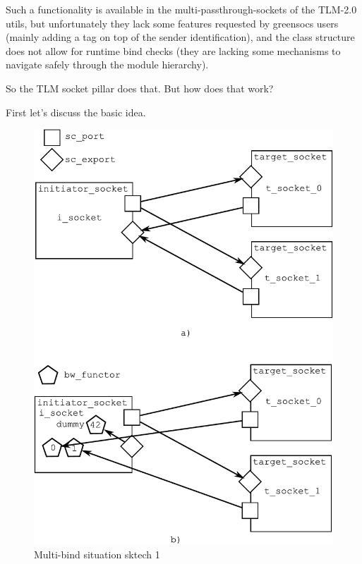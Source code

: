 \documentclass[a4paper,10pt]{article}          %
\begin{document}
Such a functionality is available in the multi-passthrough-sockets of the TLM-2.0 utils, but unfortunately they lack some features requested by greensocs users (mainly adding a tag on top of the sender identification), and the class structure does not allow for runtime bind checks (they are lacking some mechanisms to navigate safely through the module hierarchy).

So the TLM socket pillar does that.  But how does that work?

First let's discuss the basic idea. 


\begin{figure}[htbp]
\begin{center}
\includegraphics[scale=0.7]{multib1}
\caption{Multi-bind situation sktech 1}
\label{fig:multib1}
\end{center}
\end{figure}
\end{document}
